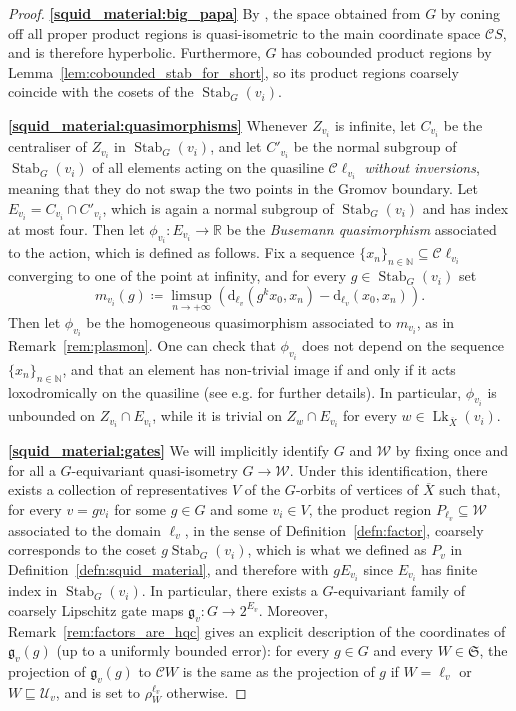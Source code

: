 \documentclass[svgnames]{amsart}
\theoremstyle{plain}
\theoremstyle{definition}
\newcommand{\frakS}{\mathfrak S}
\newcommand{\C}{\mathcal C}
\newcommand{\ov}[1]{\overline{#1}}
\newcommand{\U}{\mathcal{U}}
\newcommand{\dist}{\mathrm{d}}
\newcommand{\nest}{\sqsubseteq}
\newcommand{\link}{\operatorname{Lk}}
\newcommand{\Stab}[2]{\operatorname{Stab}_{#1}(#2)}
\newcommand{\W}{\mathcal{W}}
\newcommand{\gate}{\mathfrak{g}}
\begin{document}
\begin{proof}
\par\medskip
\textbf{\eqref{squid_material:big_papa}} By \cite[Remark 2.10]{hhs_asdim}, the space obtained from $G$ by coning off all proper product regions is quasi-isometric to the main coordinate space $\C S$, and is therefore hyperbolic. Furthermore, $G$ has cobounded product regions by Lemma~\ref{lem:cobounded_stab_for_short}, so its product regions coarsely coincide with the cosets of the $\Stab{G}{v_i}$.

\par\medskip
\textbf{\eqref{squid_material:quasimorphisms}} Whenever $Z_{v_i}$ is infinite, let $C_{v_i}$ be the centraliser of $Z_{v_i}$ in $\Stab{G}{v_i}$, and let $C'_{v_i}$ be the normal subgroup of $\Stab{G}{v_i}$ of all elements acting on the quasiline $\C\ell_{v_i}$ \emph{without inversions}, meaning that they do not swap the two points in the Gromov boundary. Let $E_{v_i}=C_{v_i}\cap C'_{v_i}$, which is again a normal subgroup of $\Stab{G}{v_i}$ and has index at most four. 
Then let $\phi_{v_i}\colon E_{v_i}\to\mathbb{R}$ be the \emph{Busemann quasimorphism} associated to the action, which is defined as follows. Fix a sequence $\{x_n\}_{n\in\mathbb{N}}\subseteq \C\ell_{v_i}$ converging to one of the point at infinity, and for every $g\in \Stab{G}{v_i}$ set
        $$m_{v_i}(g)\coloneq \limsup_{n\to+\infty}\left(\dist_{\ell_v}(g^k x_0, x_n)-\dist_{\ell_v}(x_0, x_n)\right).$$
        Then let $\phi_{v_i}$ be the homogeneous quasimorphism associated to $m_{v_i}$, as in Remark~\ref{rem:plasmon}. One can check that $\phi_{v_i}$ does not depend on the sequence $\{x_n\}_{n\in\mathbb{N}}$, and that an element has non-trivial image if and only if it acts loxodromically on the quasiline (see e.g. \cite[Section 4.1]{Manning_actions_on_hyp} for further details). In particular, $\phi_{v_i}$ is unbounded on $Z_{v_i}\cap E_{v_i}$, while it is trivial on $Z_w\cap E_{v_i}$ for every $w\in\link_{\ov X}({v_i})$. 
        
\par\medskip
\textbf{\eqref{squid_material:gates}}
We will implicitly identify $G$ and $\W$ by fixing once and for all a $G$-equivariant quasi-isometry $G\to \W$. Under this identification, there exists a collection of representatives $V$ of the $G$-orbits of vertices of $\ov{X}$ such that, for every $v=gv_i$ for some $g\in G$ and some $v_i\in V$, the product region $P_{\ell_v}\subseteq \W$ associated to the domain $\ell_v$, in the sense of Definition~\ref{defn:factor}, coarsely corresponds to the coset $g\Stab{G}{v_i}$, which is what we defined as $P_v$ in Definition~\ref{defn:squid_material}, and therefore with $g E_{v_i}$ since $E_{v_i}$ has finite index in $\Stab{G}{v_i}$. In particular, there exists a $G$-equivariant family of coarsely Lipschitz gate maps $\gate_v\colon G\to 2^{E_v}$. Moreover, Remark~\ref{rem:factors_are_hqc} gives an explicit description of the coordinates of $\gate_v(g)$ (up to a uniformly bounded error): for every $g\in G$ and every $W\in\frakS$, the projection of $\gate_v(g)$ to $\C W$ is the same as the projection of $g$ if $W=\ell_v$ or $W\nest\U_v$, and is set to $\rho^{\ell_v}_W$ otherwise.


\end{proof}
\end{document}

